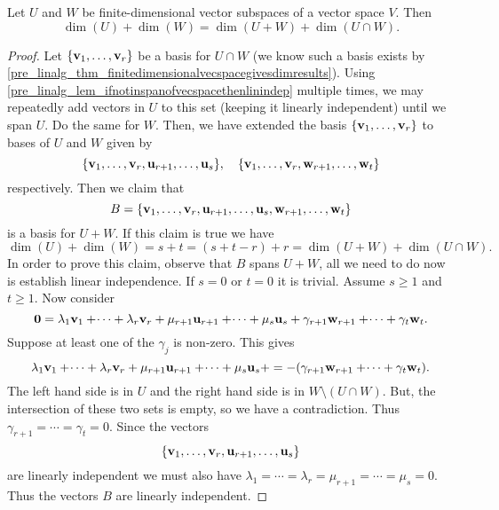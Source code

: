\documentclass[10pt, a4paper]{article}
\begin{document}
\begin{proposition}\label{pre_linalg_prop_sumofdimsissumofsumandintersection}
    Let $U$ and $W$ be finite-dimensional vector subspaces of a vector space $V$.
    Then
    \[
    \dim(U) + \dim(W) = \dim(U + W) + \dim(U \cap W).
    \]
    \begin{proof}
        Let $\{\mathbf{v}_1, \dotsc, \mathbf{v}_r\}$ be a basis for $U \cap W$
        (we know such a basis exists by \autoref{pre_linalg_thm_finitedimensionalvecspacegivesdimresults}).
        Using \autoref{pre_linalg_lem_ifnotinspanofvecspacethenlinindep} multiple times,
        we may repeatedly add vectors in $U$ to this set
        (keeping it linearly independent)
        until we span $U$.
        Do the same for $W$.
        Then,
        we have extended the basis $\{\mathbf{v}_1, \dotsc, \mathbf{v}_r\}$ to bases of $U$ and $W$ given by
        \[
        \{\mathbf{v}_1, \dotsc, \mathbf{v}_r, \mathbf{u}_{r + 1}, \dotsc, \mathbf{u}_s\},\quad\{\mathbf{v}_1, \dotsc, \mathbf{v}_r, \mathbf{w}_{r + 1}, \dotsc, \mathbf{w}_t\}
        \]
        respectively.
        Then we claim that
        \[
        B = \{\mathbf{v}_1, \dotsc, \mathbf{v}_r, \mathbf{u}_{r + 1}, \dotsc, \mathbf{u}_s, \mathbf{w}_{r + 1}, \dotsc, \mathbf{w}_t\}
        \]
        is a basis for $U + W$.
        If this claim is true we have
        \[
        \dim(U) + \dim(W) = s + t = (s + t - r) + r = \dim(U + W) + \dim(U \cap W).
        \]
        In order to prove this claim,
        observe that $B$ spans $U + W$,
        all we need to do now is establish linear independence.
        If $s = 0$ or $t = 0$ it is trivial.
        Assume $s \geq 1$ and $t \geq 1$.
        Now consider
        \[
        \mathbf{0} = \lambda_1\mathbf{v}_1 + \dotsi + \lambda_r\mathbf{v}_r + \mu_{r + 1}\mathbf{u}_{r + 1} + \dotsi + \mu_s\mathbf{u}_s + \gamma_{r + 1}\mathbf{w}_{r + 1} + \dotsi + \gamma_t\mathbf{w}_t.
        \]
        Suppose at least one of the $\gamma_j$ is non-zero.
        This gives
        \[
        \lambda_1\mathbf{v}_1 + \dotsi + \lambda_r\mathbf{v}_r + \mu_{r + 1}\mathbf{u}_{r + 1} + \dotsi + \mu_s\mathbf{u}_s + = -(\gamma_{r + 1}\mathbf{w}_{r + 1} + \dotsi + \gamma_t\mathbf{w}_t).
        \]
        The left hand side is in $U$ and the right hand side is in $W \setminus (U \cap W)$.
        But,
        the intersection of these two sets is empty,
        so we have a contradiction.
        Thus $\gamma_{r + 1} = \dotsi = \gamma_t = 0$.
        Since the vectors
        \[
        \{\mathbf{v}_1, \dotsc, \mathbf{v}_r, \mathbf{u}_{r + 1}, \dotsc, \mathbf{u}_s\}
        \]
        are linearly independent we must also have $\lambda_1 = \dotsi = \lambda_r = \mu_{r + 1} = \dotsi = \mu_s = 0$.
        Thus the vectors $B$ are linearly independent.
    \end{proof}
\end{proposition}
\end{document}
